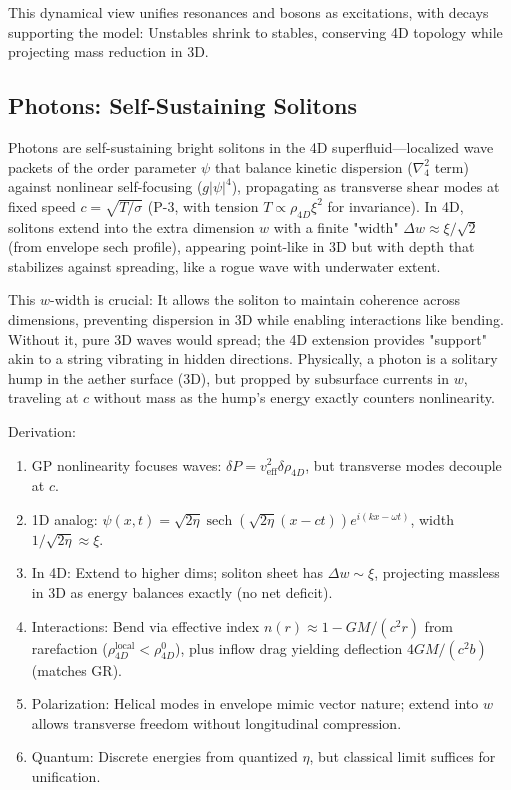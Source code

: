 \documentclass{article}
\DeclareMathOperator{\sech}{sech}
\begin{document}
This dynamical view unifies resonances and bosons as excitations, with decays supporting the model: Unstables shrink to stables, conserving 4D topology while projecting mass reduction in 3D.

\subsection{Photons: Self-Sustaining Solitons}

Photons are self-sustaining bright solitons in the 4D superfluid—localized wave packets of the order parameter $\psi$ that balance kinetic dispersion ($\nabla_4^2$ term) against nonlinear self-focusing ($g |\psi|^4$), propagating as transverse shear modes at fixed speed $c = \sqrt{T / \sigma}$ (P-3, with tension $T \propto \rho_{4D} \xi^2$ for invariance). In 4D, solitons extend into the extra dimension $w$ with a finite "width" $\Delta w \approx \xi / \sqrt{2}$ (from envelope sech profile), appearing point-like in 3D but with depth that stabilizes against spreading, like a rogue wave with underwater extent.

This $w$-width is crucial: It allows the soliton to maintain coherence across dimensions, preventing dispersion in 3D while enabling interactions like bending. Without it, pure 3D waves would spread; the 4D extension provides "support" akin to a string vibrating in hidden directions. Physically, a photon is a solitary hump in the aether surface (3D), but propped by subsurface currents in $w$, traveling at $c$ without mass as the hump's energy exactly counters nonlinearity.

Derivation:
\begin{enumerate}
\item GP nonlinearity focuses waves: $\delta P = v_{\text{eff}}^2 \delta \rho_{4D}$, but transverse modes decouple at $c$.
\item 1D analog: $\psi(x,t) = \sqrt{2 \eta} \sech(\sqrt{2 \eta} (x - c t)) e^{i (k x - \omega t)}$, width $1 / \sqrt{2 \eta} \approx \xi$.
\item In 4D: Extend to higher dims; soliton sheet has $\Delta w \sim \xi$, projecting massless in 3D as energy balances exactly (no net deficit).
\item Interactions: Bend via effective index $n(r) \approx 1 - GM/(c^2 r)$ from rarefaction ($\rho_{4D}^{\text{local}} < \rho_{4D}^0$), plus inflow drag yielding deflection $4 GM / (c^2 b)$ (matches GR).
\item Polarization: Helical modes in envelope mimic vector nature; extend into $w$ allows transverse freedom without longitudinal compression.
\item Quantum: Discrete energies from quantized $\eta$, but classical limit suffices for unification.
\end{enumerate}
\end{document}
